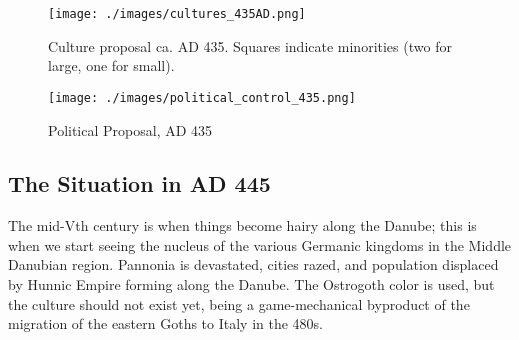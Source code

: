 \documentclass{article}
\begin{document}
	\newpage
	
	\begin{figure}[h!]
		\centering
		\texttt{[image: ./images/cultures\_435AD.png]}
		\caption{Culture proposal ca. AD 435. Squares indicate minorities (two for large, one for small).}
	\end{figure}
	
	\begin{figure}[h!]
		\centering
		\texttt{[image: ./images/political\_control\_435.png]}
		\caption{Political Proposal, AD 435}
	\end{figure}
	
	\newpage
	
	\subsection{The Situation in AD 445}
	\label{sec:timeline:subsec:445}
	The mid-Vth century is when things become hairy along the Danube; this is when we start seeing the nucleus of the various Germanic kingdoms in the Middle Danubian region.
	Pannonia is devastated, cities razed, and population displaced by Hunnic Empire forming along the Danube.
	The Ostrogoth color is used, but the culture should not exist yet, being a game-mechanical byproduct of the migration of the eastern Goths to Italy in the 480s.
	
\end{document}

